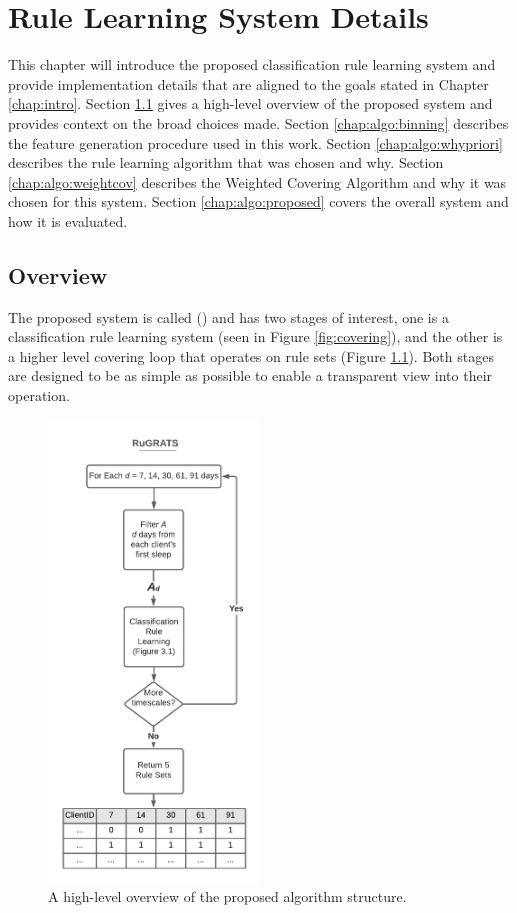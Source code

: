 
\chapter{Rule Learning System Details} \label{chap:algo}

This chapter will introduce the proposed classification rule learning system and provide implementation details that are aligned to the goals stated in Chapter \ref{chap:intro}.
Section \ref{chap:algo:overview} gives a high-level overview of the proposed system and provides context on the broad choices made.
Section \ref{chap:algo:binning} describes the feature generation procedure used in this work.
Section \ref{chap:algo:whypriori} describes the rule learning algorithm that was chosen and why.
Section \ref{chap:algo:weightcov} describes the Weighted Covering Algorithm and why it was chosen for this system.
Section \ref{chap:algo:proposed} covers the overall system and how it is evaluated.

\section{Overview} \label{chap:algo:overview}
The proposed system is called \Name (\Abb) and has two stages of interest, one is a classification rule learning system (seen in Figure \ref{fig:covering}), and the other is a higher level covering loop that operates on rule sets (Figure \ref{fig:highlevel}). Both stages are designed to be as simple as possible to enable a transparent view into their operation. 



\begin{figure}[h]
    \centering
    \includegraphics[width=0.5\textwidth]{Figures/RuGRATS.pdf}
    \caption{A high-level overview of the proposed algorithm structure.}
		\label{fig:highlevel}
\end{figure}

